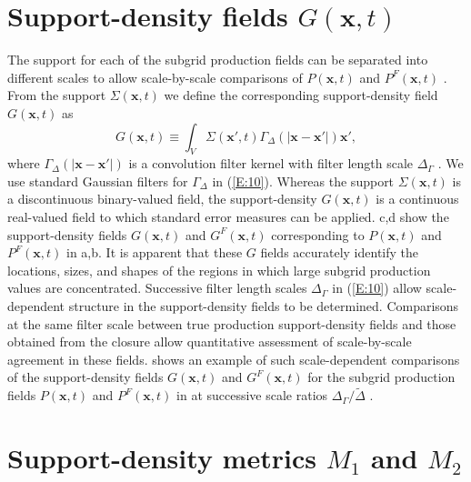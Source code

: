 \section{Support-density fields $G(\mathbf{x},t)$ }
\label{sec:IIID}

The support for each of the subgrid production fields can be separated into different scales to allow scale-by-scale comparisons of  $P(\mathbf{x},t)$ and $P^F(\mathbf{x},t)$   . From the support  $\Sigma(\mathbf{x},t)$  we define the corresponding support-density field  $G(\mathbf{x},t)$  as 
%
\begin{equation}
	\label{E:10}
	G(\mathbf{x},t) 
	\equiv 
	\int_{V} \Sigma(\mathbf{x'},t)\Gamma_{\Delta}(|\mathbf{x} - \mathbf{x'}|) \mathbf{x'}, 
\end{equation}
%
%                
where $\Gamma_{\Delta}(|\mathbf{x} - \mathbf{x'}|)$  is a convolution filter kernel with filter length scale $\Delta_{\Gamma}$ . We use standard Gaussian filters for $\Gamma_{\Delta}$  in (\ref{E:10}). Whereas the support $\Sigma(\mathbf{x},t)$  is a discontinuous binary-valued field, the support-density $G(\mathbf{x},t)$  is a continuous real-valued field to which standard error measures can be applied. c,d show the support-density fields $G(\mathbf{x},t)$  and  $G^{F}(\mathbf{x},t)$ corresponding to   $P(\mathbf{x},t)$  and  $P^{F}(\mathbf{x},t)$   in a,b. It is apparent that these $G$ fields accurately identify the locations, sizes, and shapes of the regions in which large subgrid production values are concentrated. 
Successive filter length scales  $\Delta_{\Gamma}$ in (\ref{E:10}) allow scale-dependent structure in the support-density fields to be determined. Comparisons at the same filter scale between true production support-density fields and those obtained from the closure allow quantitative assessment of scale-by-scale agreement in these fields.  shows an example of such scale-dependent comparisons of the support-density fields   $G(\mathbf{x},t)$  and  $G^{F}(\mathbf{x},t)$   for the subgrid production fields   $P(\mathbf{x},t)$  and  $P^{F}(\mathbf{x},t)$   in  at successive scale ratios $\Delta_{\Gamma}/\widetilde{\Delta}$ . 

\section{Support-density metrics  $M_1$ and $M_2$ }
\label{sec:IIIE}

